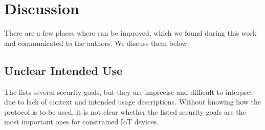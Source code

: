 \documentclass[runningheads, envcountsame, hidelinks, a4paper, draft, x11names]{llncs}
\begin{document}
\section{Discussion}
\label{sec:discussion}
There are a few places where \mEdhoc{} can be improved,
which we found during this work and communicated to the authors.
%
We discuss them below. 
%

%

\subsection{Unclear Intended Use}
\label{sec:unclearProtocolUse}
%
The \mEdhoc{} \mSpec{} lists several security goals, but they are
imprecise and difficult to interpret due to lack of context and intended usage
descriptions.
%
Without knowing how the protocol is to be used,
it is not clear whether the listed security goals are the most important ones
for constrained IoT devices.
%
\end{document}
